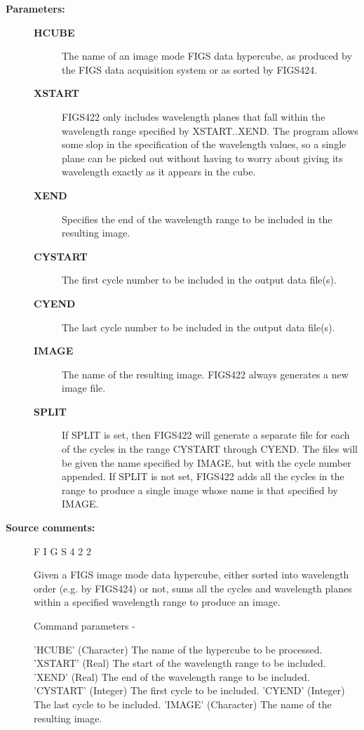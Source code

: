 \begin{description}
\begin{description}
\item [\textbf{Parameters:}]
\begin{description}
\item [\textbf{HCUBE}]
 The name of an image mode FIGS data hypercube,
 as produced by the FIGS data acquisition system
 or as sorted by FIGS424.
\item [\textbf{XSTART}]
 FIGS422 only includes wavelength planes that fall
 within the wavelength range specified by XSTART..XEND.
 The program allows some slop in the specification of
 the wavelength values, so a single plane can be picked
 out without having to worry about giving its wavelength
 exactly as it appears in the cube.
\item [\textbf{XEND}]
 Specifies the end of the wavelength range to be
 included in the resulting image.
\item [\textbf{CYSTART}]
 The first cycle number to be included in the
 output data file(s).
\item [\textbf{CYEND}]
 The last cycle number to be included in the
 output data file(s).
\item [\textbf{IMAGE}]
 The name of the resulting image.
 FIGS422 always generates a new image file.
\item [\textbf{SPLIT}]
 If SPLIT is set, then FIGS422 will generate a separate
 file for each of the cycles in the range CYSTART through
 CYEND.  The files will be given the name specified by
 IMAGE, but with the cycle number appended.  If SPLIT is
 not set, FIGS422 adds all the cycles in the range to
 produce a single image whose name is that specified by
 IMAGE.
\end{description}

\item [\textbf{Source comments:}]
\begin{terminalv}
 F I G S 4 2 2

 Given a FIGS image mode data hypercube, either sorted into
 wavelength order (e.g. by FIGS424) or not, sums all the cycles
 and wavelength planes within a specified wavelength range
 to produce an image.

 Command parameters -

 'HCUBE'    (Character) The name of the hypercube to be processed.
 'XSTART'   (Real) The start of the wavelength range to be included.
 'XEND'     (Real) The end of the wavelength range to be included.
 'CYSTART'  (Integer) The first cycle to be included.
 'CYEND'    (Integer) The last cycle to be included.
 'IMAGE'    (Character) The name of the resulting image.


\end{terminalv}
\end{description}
\end{description}
